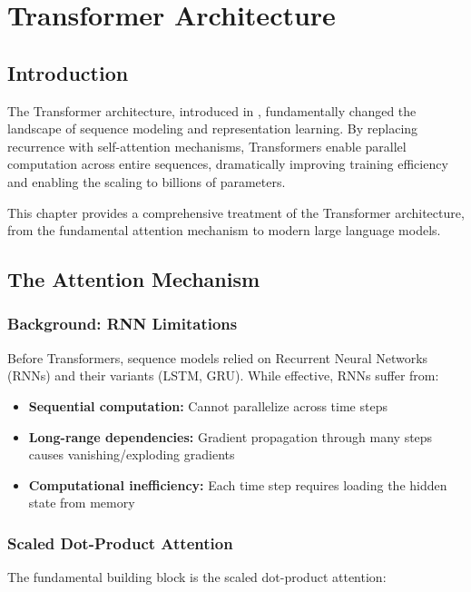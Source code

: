 \clearpage
\cleardoublepage

\chapter{Transformer Architecture}

\section{Introduction}

The Transformer architecture, introduced in \cite{vaswani2017attention}, fundamentally changed the landscape of sequence modeling and representation learning. By replacing recurrence with self-attention mechanisms, Transformers enable parallel computation across entire sequences, dramatically improving training efficiency and enabling the scaling to billions of parameters.

This chapter provides a comprehensive treatment of the Transformer architecture, from the fundamental attention mechanism to modern large language models.

\section{The Attention Mechanism}

\subsection{Background: RNN Limitations}

Before Transformers, sequence models relied on Recurrent Neural Networks (RNNs) and their variants (LSTM, GRU). While effective, RNNs suffer from:
\begin{itemize}
    \item \textbf{Sequential computation:} Cannot parallelize across time steps
    \item \textbf{Long-range dependencies:} Gradient propagation through many steps causes vanishing/exploding gradients
    \item \textbf{Computational inefficiency:} Each time step requires loading the hidden state from memory
\end{itemize}

\subsection{Scaled Dot-Product Attention}

The fundamental building block is the scaled dot-product attention:

